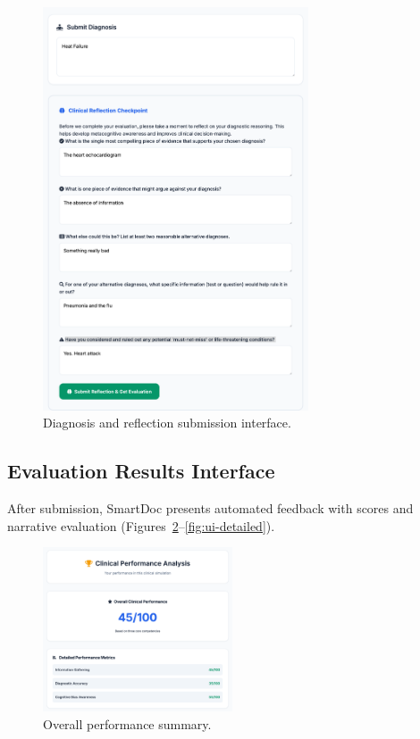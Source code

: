 \begin{figure}[h]
  \centering
  \includegraphics[width=0.7\textwidth]{figures/ui/ui_diagnosis_reflection.png}
  \caption{Diagnosis and reflection submission interface.}
  \label{fig:ui-submission}
\end{figure}

\newpage

\subsection{Evaluation Results Interface}

After submission, SmartDoc presents automated feedback with scores and narrative
evaluation (Figures~\ref{fig:ui-overall}–\ref{fig:ui-detailed}).

\begin{figure}[h]
  \centering
  \includegraphics[width=0.50\textwidth]{figures/ui/ui_overall.png}
  \caption{Overall performance summary.}
  \label{fig:ui-overall}
\end{figure}

